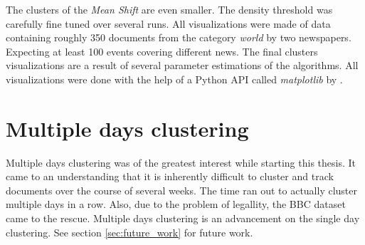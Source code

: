The clusters of the \emph{Mean Shift} are even smaller. The density threshold was carefully fine tuned over several runs. All visualizations were made of data containing roughly 350 documents from the category \emph{world} by two newspapers. Expecting at least 100 events covering different news. The final clusters visualizations are a result of several parameter estimations of the algorithms. All visualizations were done with the help of a Python API called \emph{matplotlib} by \cite{MatPlotHunter2007}.

\section{Multiple days clustering}
  Multiple days clustering was of the greatest interest while starting this thesis. It came to an understanding that it is inherently difficult to cluster and track documents over the course of several weeks. The time ran out to actually cluster multiple days in a row. Also, due to the problem of legallity, the BBC dataset came to the rescue. Multiple days clustering is an advancement on the single day clustering. See section \ref{sec:future_work} for future work.



